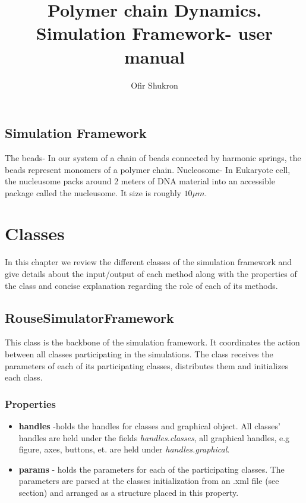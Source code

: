\documentclass[12pt]{report}
\title{Polymer chain Dynamics. Simulation Framework- user manual}
\author{Ofir Shukron}
\begin{document}
\maketitle
\tableofcontents

\section{Simulation Framework}\label{secSimulatorFramework}
The beads- In our system of a chain of beads connected by harmonic springs, the beads represent monomers of a polymer chain. 
Nucleosome- In Eukaryote cell, the nucleusome packs around 2 meters of DNA material into an accessible package called the nucleusome. It size is roughly $10\mu m$.

\chapter{Classes}\label{classes}
In this chapter we review the different classes of the simulation framework and give details about the input/output of each method along with the properties of the class and concise explanation regarding the role of each of its methods.

\section{RouseSimulatorFramework}\label{secRouseSimulatorFramework}
This class is the backbone of the simulation framework. It coordinates the action between all classes participating in the simulations. The class receives the parameters of each of its participating classes, distributes them and initializes each class.

\subsection{Properties}
\begin{itemize}
\item{\textbf{handles}} -holds the handles for classes and graphical object. All classes' handles are held under the fields \textit{handles.classes}, all graphical handles, e.g figure, axes, buttons, et. are held under \textit{handles.graphical}. 
\item{\textbf{params}} - holds the parameters for each of the participating classes. The parameters are parsed at the classes initialization from an .xml file (see section) and arranged as a structure placed in this property.
\end{itemize}
\end{document}
